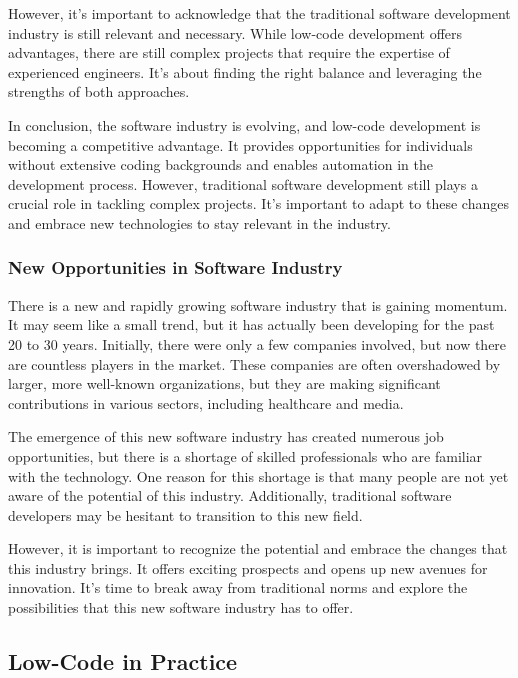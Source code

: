 However, it's important to acknowledge that the traditional software
development industry is still relevant and necessary. While low-code
development offers advantages, there are still complex projects that
require the expertise of experienced engineers. It's about finding the
right balance and leveraging the strengths of both approaches.

In conclusion, the software industry is evolving, and low-code
development is becoming a competitive advantage. It provides
opportunities for individuals without extensive coding backgrounds and
enables automation in the development process. However, traditional
software development still plays a crucial role in tackling complex
projects. It's important to adapt to these changes and embrace new
technologies to stay relevant in the industry.

\subsubsection{New Opportunities in Software
  Industry}\label{new-opportunities-in-software-industry}

There is a new and rapidly growing software industry that is gaining
momentum. It may seem like a small trend, but it has actually been
developing for the past 20 to 30 years. Initially, there were only a few
companies involved, but now there are countless players in the market.
These companies are often overshadowed by larger, more well-known
organizations, but they are making significant contributions in various
sectors, including healthcare and media.

The emergence of this new software industry has created numerous job
opportunities, but there is a shortage of skilled professionals who are
familiar with the technology. One reason for this shortage is that many
people are not yet aware of the potential of this industry.
Additionally, traditional software developers may be hesitant to
transition to this new field.

However, it is important to recognize the potential and embrace the
changes that this industry brings. It offers exciting prospects and
opens up new avenues for innovation. It's time to break away from
traditional norms and explore the possibilities that this new software
industry has to offer.

\subsection{Low-Code in Practice}\label{low-code-in-practice}

